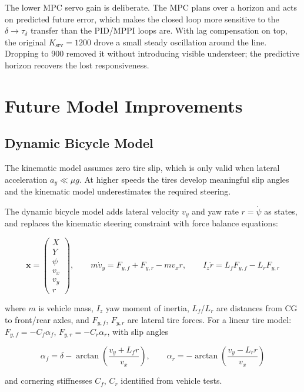 \documentclass[11pt]{article}
\begin{document}
The lower MPC servo gain is deliberate.  The MPC plans over a horizon and
acts on predicted future error, which makes the closed loop more sensitive
to the $\delta \to \tau_\delta$ transfer than the PID/MPPI loops are.  With
lag compensation on top, the original $K_{\text{srv}} = 1200$ drove a
small steady oscillation around the line.  Dropping to 900 removed it
without introducing visible understeer; the predictive horizon recovers
the lost responsiveness.


\section{Future Model Improvements}

\subsection{Dynamic Bicycle Model}

The kinematic model assumes zero tire slip, which is only valid when lateral
acceleration $a_y \ll \mu g$.  At higher speeds the tires develop meaningful
slip angles and the kinematic model underestimates the required steering.

The dynamic bicycle model adds lateral velocity $v_y$ and yaw rate
$r = \dot{\psi}$ as states, and replaces the kinematic steering constraint with
force balance equations:

\[
\bm{x} = \begin{pmatrix} X \\ Y \\ \psi \\ v_x \\ v_y \\ r \end{pmatrix},
\qquad
m\dot{v}_y = F_{y,f} + F_{y,r} - m v_x r, \qquad
I_z\dot{r} = L_f F_{y,f} - L_r F_{y,r}
\]

where $m$ is vehicle mass, $I_z$ yaw moment of inertia, $L_f$/$L_r$ are
distances from CG to front/rear axles, and $F_{y,f}$, $F_{y,r}$ are lateral
tire forces.  For a linear tire model: $F_{y,f} = -C_f\alpha_f$,
$F_{y,r} = -C_r\alpha_r$, with slip angles

\[
\alpha_f = \delta - \arctan\!\left(\frac{v_y + L_f r}{v_x}\right), \qquad
\alpha_r = -\arctan\!\left(\frac{v_y - L_r r}{v_x}\right)
\]

and cornering stiffnesses $C_f$, $C_r$ identified from vehicle tests.
\end{document}
